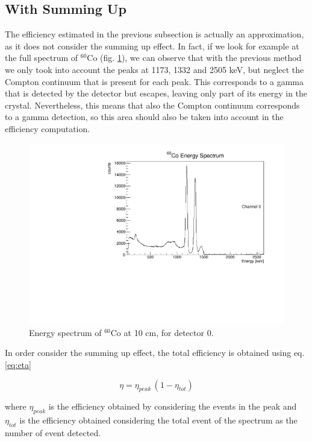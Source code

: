 \subsection{With Summing Up}
\label{sub:nocoinc}

The efficiency estimated in the previous subsection is actually an approximation, as it does not consider the summing up effect. In fact, if we look for example at the full spectrum of $^{60}$Co (fig. \ref{fig:co}), we can observe that with the previous method we only took into account the peaks at 1173, 1332 and 2505 keV, but neglect the Compton continuum that is present for each peak. This corresponds to a gamma that is detected by the detector but escapes, leaving only part of its energy in the crystal. Nevertheless, this means that also the Compton continuum corresponds to a gamma detection, so this area should also be taken into account in the efficiency computation. 

\begin{figure}[H]
    \centering
    \includegraphics[scale=0.5]{Images/analysis/efficiency/Co.pdf}
    \caption{Energy spectrum of $^{60}$Co at 10 cm, for detector 0.}
    \label{fig:co}
\end{figure}

In order consider the summing up effect, the total efficiency is obtained using eq. \ref{eq:eta}

\begin{equation} \label{eq:eta}
    \eta=\eta_{peak} \, (1-\eta_{tot})
\end{equation}

where $\eta_{peak}$ is the efficiency obtained by considering the events in the peak and $\eta_{tot}$ is the efficiency obtained considering the total event of the spectrum as the number of event detected. \\

